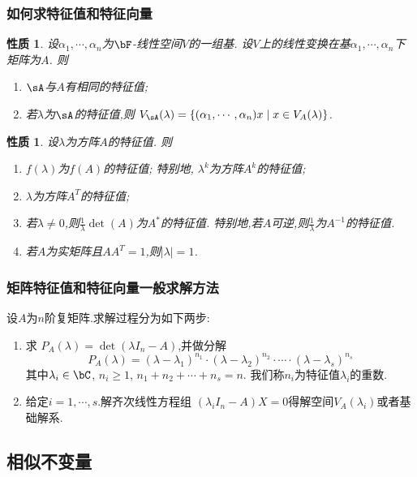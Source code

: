 \documentclass{article}
\newtheorem{proposition}[theorem]{性质}  %
\renewcommand{\blue }[1]{{\textcolor[rgb]{0,0,1}{#1}}}
\begin{document}
\subsubsection{如何求特征值和特征向量}
\begin{proposition}
设$\alpha_1,\cdots,\alpha_n$为$\bF$-线性空间$V$的一组基.
设$V$上的线性变换在基$\alpha_1,\cdots,\alpha_n$下矩阵为$A$.
则
\begin{enumerate}
\item $\sA$与$A$有相同的特征值;
\item 若$\lambda$为$\sA$的特征值,则 $V_\sA(\lambda)=\{(\alpha_1,\cdots,\alpha_n)x\mid x\in V_A(\lambda)\}$.
\end{enumerate}
\end{proposition}
\begin{proposition}
设$\lambda$为方阵$A$的特征值.
则
\begin{enumerate}
\item $f(\lambda)$为$f(A)$的特征值;
特别地, $\lambda^k$为方阵$A^k$的特征值;
\item $\lambda$为方阵$A^T$的特征值;
\item 若$\lambda\neq0$,则$\frac1\lambda\det(A)$为$A^*$的特征值.
特别地,若$A$可逆,则$\frac1\lambda$为$A^{-1}$的特征值.
\item 若$A$为实矩阵且$AA^T=1$,则$|\lambda|=1$.
\end{enumerate}
\end{proposition}

\subsubsection{矩阵特征值和特征向量一般求解方法}
设$A$为$n$阶复矩阵.求解过程分为如下两步:
\begin{enumerate}
\item 求 $P_A(\lambda)=\det(\lambda I_n - A)$,并做分解
\[P_A(\lambda) = (\lambda-\lambda_1)^{n_1}\cdot(\lambda-\lambda_2)^{n_2}\cdot\cdots\cdot(\lambda-\lambda_s)^{n_s}\]
其中$\lambda_i\in\bC$, $n_i\geq1$, $n_1+n_2+\cdots+n_s=n$.
我们称$n_i$为特征值$\lambda_i$的\blue{重数}.
\item 给定$i=1,\cdots,s$.解齐次线性方程组 $(\lambda_iI_n-A)X=0$得解空间$V_A(\lambda_i)$或者基础解系.
\end{enumerate}


\subsection{相似不变量}
\end{document}
